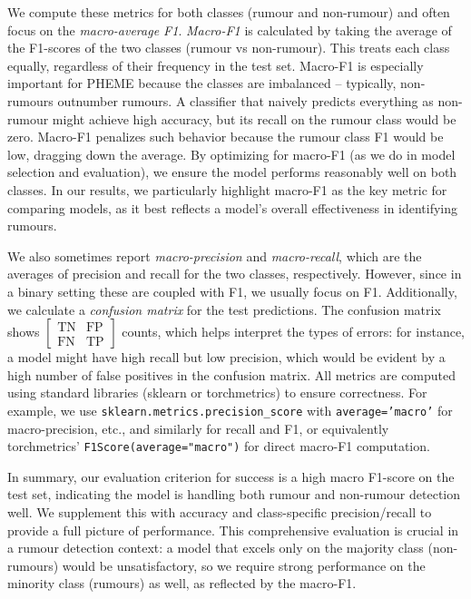 \documentclass{cshonours}
\begin{document}
We compute these metrics for both classes (rumour and non-rumour) and often focus on the \emph{macro-average F1}. \emph{Macro-F1} is calculated by taking the average of the F1-scores of the two classes (rumour vs non-rumour). This treats each class equally, regardless of their frequency in the test set. Macro-F1 is especially important for PHEME because the classes are imbalanced – typically, non-rumours outnumber rumours. A classifier that naively predicts everything as non-rumour might achieve high accuracy, but its recall on the rumour class would be zero. Macro-F1 penalizes such behavior because the rumour class F1 would be low, dragging down the average. By optimizing for macro-F1 (as we do in model selection and evaluation), we ensure the model performs reasonably well on both classes. In our results, we particularly highlight macro-F1 as the key metric for comparing models, as it best reflects a model's overall effectiveness in identifying rumours.

We also sometimes report \emph{macro-precision} and \emph{macro-recall}, which are the averages of precision and recall for the two classes, respectively. However, since in a binary setting these are coupled with F1, we usually focus on F1. Additionally, we calculate a \emph{confusion matrix} for the test predictions. The confusion matrix shows $\begin{bmatrix} \text{TN} & \text{FP} \\ \text{FN} & \text{TP} \end{bmatrix}$ counts, which helps interpret the types of errors: for instance, a model might have high recall but low precision, which would be evident by a high number of false positives in the confusion matrix. All metrics are computed using standard libraries (sklearn or torchmetrics) to ensure correctness. For example, we use \texttt{sklearn.metrics.precision\_score} with \texttt{average='macro'} for macro-precision, etc., and similarly for recall and F1, or equivalently torchmetrics' \texttt{F1Score(average="macro")} for direct macro-F1 computation.

In summary, our evaluation criterion for success is a high macro F1-score on the test set, indicating the model is handling both rumour and non-rumour detection well. We supplement this with accuracy and class-specific precision/recall to provide a full picture of performance. This comprehensive evaluation is crucial in a rumour detection context: a model that excels only on the majority class (non-rumours) would be unsatisfactory, so we require strong performance on the minority class (rumours) as well, as reflected by the macro-F1.
\end{document}

